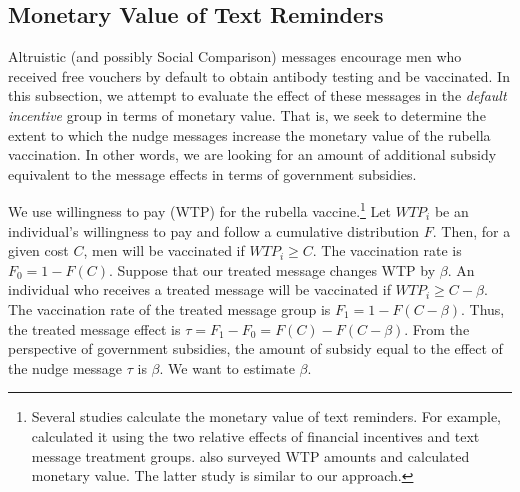 \documentclass[
]{article}
\begin{document}
\hypertarget{monetary-value-of-text-reminders}{%
\subsection{Monetary Value of Text Reminders}\label{monetary-value-of-text-reminders}}

Altruistic (and possibly Social Comparison) messages encourage men who received free vouchers by default to obtain antibody testing and be vaccinated. In this subsection, we attempt to evaluate the effect of these messages in the \emph{default incentive} group in terms of monetary value. That is, we seek to determine the extent to which the nudge messages increase the monetary value of the rubella vaccination. In other words, we are looking for an amount of additional subsidy equivalent to the message effects in terms of government subsidies.

We use willingness to pay (WTP) for the rubella vaccine.\footnote{Several studies calculate the monetary value of text reminders. For example,\cite{Bursztyn2019} calculated it using the two relative effects of financial incentives and text message treatment groups. \cite{Moriwaki2020} also surveyed WTP amounts and calculated monetary value. The latter study is similar to our approach.} Let \(WTP_i\) be an individual's willingness to pay and follow a cumulative distribution \(F\). Then, for a given cost \(C\), men will be vaccinated if \(WTP_i \ge C\). The vaccination rate is \(F_0 = 1-F(C)\). Suppose that our treated message changes WTP by \(\beta\). An individual who receives a treated message will be vaccinated if \(WTP_i\ge C-\beta\). The vaccination rate of the treated message group is \(F_1 = 1-F(C-\beta)\). Thus, the treated message effect is \(\tau = F_1-F_0=F(C)-F(C-\beta)\). From the perspective of government subsidies, the amount of subsidy equal to the effect of the nudge message \(\tau\) is \(\beta\). We want to estimate \(\beta\).
\end{document}
